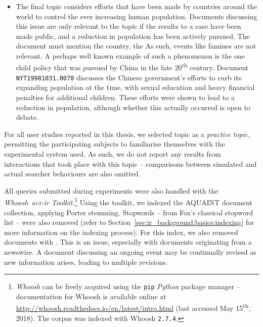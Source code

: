 \begin{itemize}
    \item[]{ The final topic considers efforts that have been made by countries around the world to control the ever increasing human population. Documents discussing this issue are only relevant to the topic if the results to a case have been made public, and a reduction in population has been actively pursued. The document must mention the country, the As such, events like famines are not relevant. A perhaps well known example of such a phenomenon is the one child policy that was pursued by China in the late 20\textsuperscript{th} century. Document \texttt{NYT19981031.0070} discusses the Chinese government's efforts to curb its expanding population at the time, with sexual education and heavy financial penalties for additional children. These efforts were shown to lead to a reduction in population, although whether this actually occurred is open to debate.}
    
\end{itemize}

For all user studies reported in this thesis, we selected topic  as a \emph{practice topic,} permitting the participating subjects to familiarise themselves with the experimental system used. As such, we do not report any results from interactions that took place with this topic -- comparisons between simulated and actual searcher behaviours are also omitted. 

All queries submitted during experiments were also handled with the \emph{Whoosh~\gls{acr:ir} Toolkit}.\footnote{\emph{Whoosh} can be freely acquired using the \texttt{pip} \emph{Python} package manager -- documentation for Whoosh is available online at \url{http://whoosh.readthedocs.io/en/latest/intro.html} (last accessed May 15\textsuperscript{th}, 2018). The corpus was indexed with Whoosh \texttt{2.7.4}.} Using the toolkit, we indexed the AQUAINT document collection, applying Porter stemming. Stopwords -- from Fox's classical stopword list -- were also removed (refer to Section~\ref{sec:ir_background:basics:indexing} for more information on the indexing process). For this index, we also removed documents with . This is an issue, especially with documents originating from a newswire. A document discussing an ongoing event may be continually revised as new information arises, leading to multiple revisions. 


